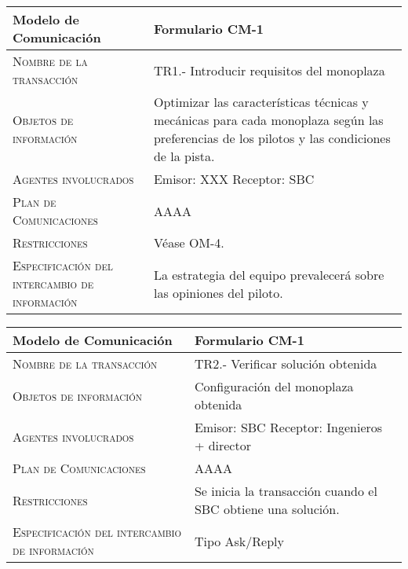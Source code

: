 \documentclass[12pt,a4paper,twoside,spanish]{article}      %
\begin{document}
\begin{table}[H]
\scriptsize
\begin{tabularx}{\textwidth}{|l|X|} \hline
\textbf{Modelo de Comunicación} & \textbf{Formulario CM-1} \\ \hline\hline

\textsc{Nombre de la transacción} & TR1.- Introducir requisitos del monoplaza

\\ \hline
\textsc{Objetos de información} & 

    Optimizar las características técnicas y mecánicas para cada monoplaza según las preferencias de los pilotos y las condiciones de la pista.
\\ \hline
\textsc{Agentes involucrados} &  Emisor: XXX
                                 Receptor: SBC\\ \hline
\textsc{Plan de Comunicaciones} &  AAAA
\\ \hline
\textsc{Restricciones} &  Véase OM-4. \\ \hline
\textsc{Especificación del intercambio de información} &  La estrategia del equipo prevalecerá sobre las opiniones del piloto.\\ \hline
\end{tabularx}
  \label{tab.CM1_1}
\end{table}


\begin{table}[H]
\scriptsize
\begin{tabularx}{\textwidth}{|l|X|} \hline
\textbf{Modelo de Comunicación} & \textbf{Formulario CM-1} \\ \hline\hline

\textsc{Nombre de la transacción} & TR2.- Verificar solución obtenida

\\ \hline
\textsc{Objetos de información} & Configuración del monoplaza obtenida
\\ \hline
\textsc{Agentes involucrados} &  Emisor: SBC
                                 Receptor: Ingenieros + director \\ \hline
\textsc{Plan de Comunicaciones} &  AAAA
\\ \hline
\textsc{Restricciones} &  Se inicia la transacción cuando el SBC obtiene una solución. \\ \hline
\textsc{Especificación del intercambio de información} &  Tipo Ask/Reply\\ \hline
\end{tabularx}
  \label{tab.CM1_2}
\end{table}
\end{document}

